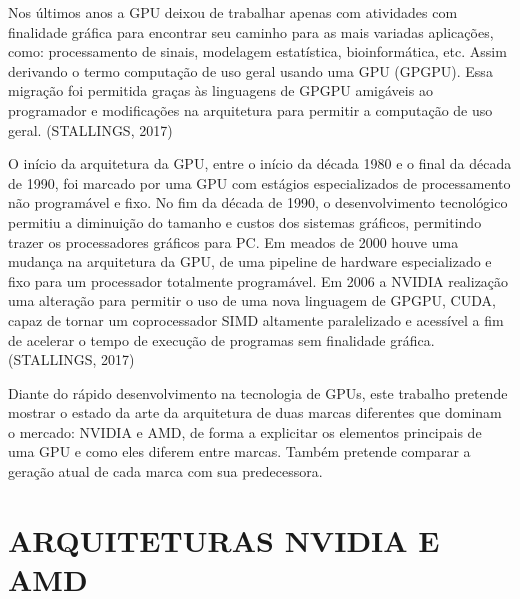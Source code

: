 \documentclass[letterpaper, 10 pt, conference]{ieeeconf}  %
\begin{document}
Nos últimos anos a GPU deixou de trabalhar apenas com atividades com finalidade gráfica para encontrar seu caminho para as mais variadas aplicações, como: processamento de sinais, modelagem estatística, bioinformática, etc. Assim derivando o termo computação de uso geral usando uma GPU (GPGPU). Essa migração foi permitida graças às linguagens de GPGPU amigáveis ao programador e modificações na arquitetura para permitir a computação de uso geral. (STALLINGS, 2017) 

O início da arquitetura da GPU, entre o início da década 1980 e o final da década de 1990, foi marcado por uma GPU com estágios especializados de processamento não programável e fixo. No fim da década de 1990, o desenvolvimento tecnológico permitiu a diminuição do tamanho e custos dos sistemas gráficos, permitindo trazer os processadores gráficos para PC. Em meados de 2000 houve uma mudança na arquitetura da GPU, de uma pipeline de hardware especializado e fixo para um processador totalmente programável. Em 2006 a NVIDIA realização uma alteração para permitir o uso de uma nova linguagem de GPGPU, CUDA, capaz de tornar um coprocessador SIMD altamente paralelizado e acessível a fim de acelerar o tempo de execução de programas sem finalidade gráfica. (STALLINGS, 2017) 

\begin{comment}
Diante do rápido desenvolvimento na tecnologia de GPUs, este trabalho pretende explicar um básico do estado da arte da arquitetura de GPGPUs, definindo características e componentes essenciais e diferenciando microarquiteturas que são voltadas para estações de trabalho e jogos e aquelas voltadas para grandes centros de dados e aprendizado de máquina, mostrando \textit{benchmarkings} feitos por outros autores na tentativa de comparar diferentes modelos de GPGPU para instruir sobre qual tecnologia se adequa melhor à determinada aplicação.
\end{comment}

Diante do rápido desenvolvimento na tecnologia de GPUs, este trabalho pretende mostrar o estado da arte da arquitetura de duas marcas diferentes que dominam o mercado: NVIDIA e AMD, de forma a explicitar os elementos principais de uma GPU e como eles diferem entre marcas. Também pretende comparar a geração atual de cada marca com sua predecessora.

\section{ARQUITETURAS NVIDIA E AMD}
\end{document}
